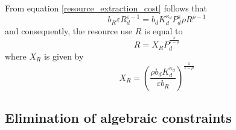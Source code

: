 From equation \eqref{resource_extraction_cost} follows that
\begin{equation}
	b_R \varepsilon R_d^{\varepsilon-1} = b_d K_d^{\kappa_d}P_d^{\pi}\rho R^{\rho-1}
	\label{optimal_resource_extraction_condition}
\end{equation}
and consequently, the resource use $R$ is equal to
\begin{equation}
	R = X_R P_d^{\frac{\pi}{\varepsilon-\rho}}
	\label{optimal_resource_extraction}
\end{equation}
where $X_R$ is given by
\begin{equation}
	X_R = \left( \frac{\rho b_d K_d^{\kappa_d}}{ \varepsilon b_R} \right)^{\frac{1}{\varepsilon-\rho}}
	\label{optimal_resource_XR}
\end{equation}

\subsection{Elimination of algebraic constraints}

